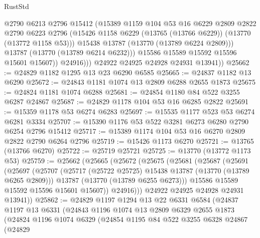 \begin{lexlean}{RustStd}
\begin{coremodule}
                    @2790
                    @6213
                    @2796
                    @15412
                    (@15389
                      @1159
                      @104
                      @53
                      @16
                      @6229
                      @2809
                      @2822
                      @2790
                      @6223
                      @2796
                      (@15426 @1158 @6229 (@13765 (@13766 @6229)) (@13770 (@13772 @1158 @53)))
                      @15438
                      @13787
                      (@13770 (@13789 @6224 @2809)))
                    @13787
                    (@13770 (@13789 @6214 @6232)))
                  @15586
                  @15589
                  @15592
                  @15596
                  @15601
                  @15607))
              @24916)))
        @24922
        @24925
        @24928
        @24931
        @13941))
@25662 := @24829 @1182 @1295 @13 @23 @6290 @6585
@25665 := @24837 @1182 @13 @6290
@25672 := @24843 @1181 @1074 @13 @2809 @6288 @2655 @1873
@25675 := @24824 @1181 @1074 @6288
@25681 := @24854 @1180 @84 @522 @3255 @6287 @24867
@25687 := @24829 @1178 @104 @53 @16 @6285 @2822
@25691 := @15359 @1178 @53 @6274 @6283
@25697 := @15535 @1177 @523 @53 @6274 @6281 @3334
@25707 := @15390 @1176 @53 @522 @3281 @6273 @6280 @2790 @6254 @2796 @15412
@25717 := @15389 @1174 @104 @53 @16 @6270 @2809 @2822 @2790 @6264 @2796
@25719 := @15426 @1173 @6270
@25721 := @13765 (@13766 @6270)
@25722 := @25719 @25721
@25725 := @13770 (@13772 @1173 @53)
@25759 := @25662
    (@25665
      (@25672
        (@25675
          (@25681
            (@25687
              (@25691
                (@25697
                  (@25707
                    (@25717 (@25722 @25725) @15438 @13787 (@13770 (@13789 @6265 @2809)))
                    @13787
                    (@13770 (@13789 @6255 @6273)))
                  @15586
                  @15589
                  @15592
                  @15596
                  @15601
                  @15607))
              @24916)))
        @24922
        @24925
        @24928
        @24931
        @13941))
@25862 := @24829
    @1197
    @1294
    @13
    @22
    @6331
    @6584
    (@24837
      @1197
      @13
      @6331
      (@24843
        @1196
        @1074
        @13
        @2809
        @6329
        @2655
        @1873
        (@24824
          @1196
          @1074
          @6329
          (@24854
            @1195
            @84
            @522
            @3255
            @6328
            @24867
            (@24829

\end{coremodule}
\end{lexlean}
